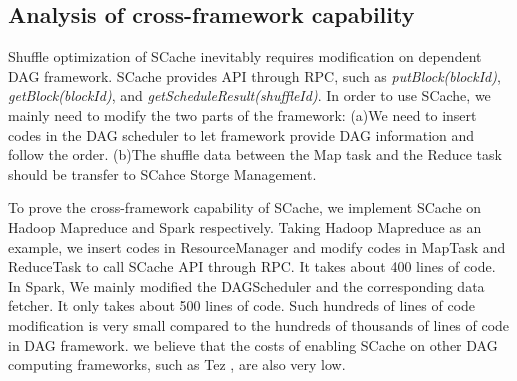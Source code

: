 {\color{blue}
\subsection{Analysis of cross-framework capability}\label{crossframework}
Shuffle optimization of SCache inevitably requires modification on dependent DAG framework. SCache provides API through RPC, such as \textit{putBlock(blockId)}, \textit{getBlock(blockId)}, and \textit{getScheduleResult(shuffleId)}. In order to use SCache, we mainly need to modify the two parts of the framework: (a)We need to insert codes in the DAG scheduler to let framework provide DAG information and follow the order. (b)The shuffle data between the Map task and the Reduce task should be transfer to SCahce Storge Management.

To prove the cross-framework capability of SCache, we implement SCache on Hadoop Mapreduce and Spark respectively. Taking Hadoop Mapreduce as an example, we insert codes in ResourceManager and modify codes in MapTask and ReduceTask to call SCache API through RPC. It takes about 400 lines of code. In Spark, We mainly modified the DAGScheduler and the corresponding data fetcher. It only takes about 500 lines of code. Such hundreds of lines of code modification is very small compared to the hundreds of thousands of lines of code in DAG framework. we believe that the costs of enabling SCache on other DAG computing frameworks, such as Tez \cite{tez}, are also very low.
}

